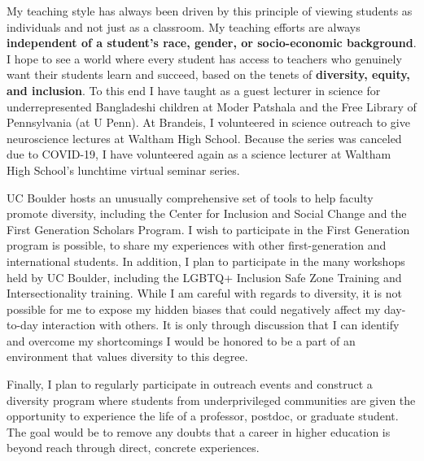 \documentclass[a4paper,11pt]{article}
\begin{document}
	My teaching style has always been driven by this principle of viewing students as individuals and not just as a classroom. My teaching efforts are always \textbf{independent of a student's race, gender, or socio-economic background}. I hope to see a world where every student has access to teachers who genuinely want their students learn and succeed, based on the tenets of \textbf{diversity, equity, and inclusion}. To this end I have taught as a guest lecturer in science for underrepresented Bangladeshi children at Moder Patshala and the Free Library of Pennsylvania (at U Penn). At Brandeis, I volunteered in science outreach to give neuroscience lectures at Waltham High School. Because the series was canceled due to COVID-19, I have volunteered again as a science lecturer at Waltham High School's lunchtime virtual seminar series.
	
	UC Boulder hosts an unusually comprehensive set of tools to help faculty promote diversity, including the Center for Inclusion and Social Change and the First Generation Scholars Program. I wish to participate in the First Generation program is possible, to share my experiences with other first-generation and international students. In addition, I plan to participate in the many workshops held by UC Boulder, including the LGBTQ+ Inclusion Safe Zone Training and Intersectionality training. While I am careful with regards to diversity, it is not possible for me to expose my hidden biases that could negatively affect my day-to-day interaction with others. It is only through discussion that I can identify and overcome my shortcomings I would be honored to be a part of an environment that values diversity to this degree.
	
	Finally, I plan to regularly participate in outreach events and construct a diversity program where students from underprivileged communities are given the opportunity to experience the life of a professor, postdoc, or graduate student. The goal would be to remove any doubts that a career in higher education is beyond reach through direct, concrete experiences.
	
	
	
	
	
\end{document}
